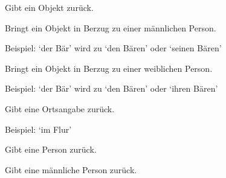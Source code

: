 \documentclass[a4paper,12pt,oneside]{sphinxmanual}
\begin{document}
\begin{fulllineitems}
\label{funktionen:pyzufall.objekt}
Gibt ein Objekt zurück.

\end{fulllineitems}


\begin{fulllineitems}
\label{funktionen:pyzufall.objekt_m}
Bringt ein Objekt in Berzug zu einer männlichen Person.

Beispiel:
`der Bär' wird zu `den Bären' oder `seinen Bären'

\end{fulllineitems}


\begin{fulllineitems}
\label{funktionen:pyzufall.objekt_w}
Bringt ein Objekt in Berzug zu einer weiblichen Person.

Beispiel:
`der Bär' wird zu `den Bären' oder `ihren Bären'

\end{fulllineitems}


\begin{fulllineitems}
\label{funktionen:pyzufall.ort}
Gibt eine Ortsangabe zurück.

Beispiel: `im Flur'

\end{fulllineitems}


\begin{fulllineitems}
\label{funktionen:pyzufall.person}
Gibt eine Person zurück.

\end{fulllineitems}


\begin{fulllineitems}
\label{funktionen:pyzufall.person_m}
Gibt eine männliche Person zurück.

\end{fulllineitems}
\end{document}

